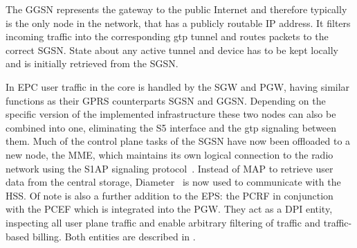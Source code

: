 The \gls{GGSN} represents the gateway to the public Internet and therefore typically is the only node in the network, that has a publicly routable \gls{IP} address. It filters incoming traffic into the corresponding \gls{gtp} tunnel and routes packets to the correct \gls{SGSN}. State about any active tunnel and device has to be kept locally and is initially retrieved from the \gls{SGSN}.

In \gls{EPC} user traffic in the core is handled by the \gls{SGW} and \gls{PGW}, having similar functions as their \gls{GPRS} counterparts \gls{SGSN} and \gls{GGSN}. Depending on the specific version of the implemented infrastructure these two nodes can also be combined into one, eliminating the S5 interface and the \gls{gtp} signaling between them. Much of the control plane tasks of the \gls{SGSN} have now been offloaded to a new node, the \gls{MME}, which maintains its own logical connection to the radio network using the \gls{S1AP} signaling protocol~\cite{3gpp.36.413}. Instead of \gls{MAP} to retrieve user data from the central storage, Diameter~\cite{rfc6733} is now used to communicate with the \gls{HSS}. Of note is also a further addition to the \gls{EPS}: the \gls{PCRF} in conjunction with the \gls{PCEF} which is integrated into the \gls{PGW}. They act as a \gls{DPI} entity, inspecting all user plane traffic and enable arbitrary filtering of traffic and traffic-based billing. Both entities are described in \cite{3gpp.23.203}.

